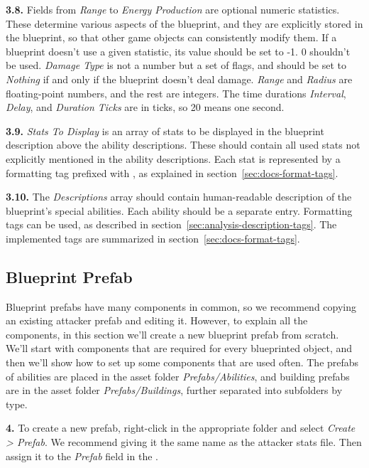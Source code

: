 \textbf{3.8.}
Fields from \emph{Range} to \emph{Energy Production} are optional numeric statistics.
These determine various aspects of the blueprint, and they are explicitly stored in the blueprint, so that other game objects can consistently modify them.
If a blueprint doesn't use a given statistic, its value should be set to -1.
0 shouldn't be used.
\emph{Damage Type} is not a number but a set of flags, and should be set to \emph{Nothing} if and only if the blueprint doesn't deal damage.
\emph{Range} and \emph{Radius} are floating-point numbers, and the rest are integers.
The time durations \emph{Interval}, \emph{Delay}, and \emph{Duration Ticks} are in ticks, so 20 means one second.

\textbf{3.9.}
\emph{Stats To Display} is an array of stats to be displayed in the blueprint description above the ability descriptions.
These should contain all used stats not explicitly mentioned in the ability descriptions.
Each stat is represented by a formatting tag prefixed with \mono{\$}, as explained in section~\ref{sec:docs-format-tags}.

\textbf{3.10.}
The \emph{Descriptions} array should contain human-readable description of the blueprint's special abilities.
Each ability should be a separate entry.
Formatting tags can be used, as described in section~\ref{sec:analysis-description-tags}.
The implemented tags are summarized in section~\ref{sec:docs-format-tags}.

\subsection{Blueprint Prefab}\label{sec:docs-blueprinted-prefab}

Blueprint prefabs have many components in common, so we recommend copying an existing attacker prefab and editing it.
However, to explain all the components, in this section we'll create a new blueprint prefab from scratch.
We'll start with components that are required for every blueprinted object, and then we'll show how to set up some components that are used often.
The prefabs of abilities are placed in the asset folder \emph{Prefabs/Abilities}, and building prefabs are in the asset folder \emph{Prefabs/Buildings}, further separated into subfolders by type.

\textbf{4.}
To create a new prefab, right-click in the appropriate folder and select \emph{Create > Prefab}.
We recommend giving it the same name as the attacker stats file.
Then assign it to the \emph{Prefab} field in the .

